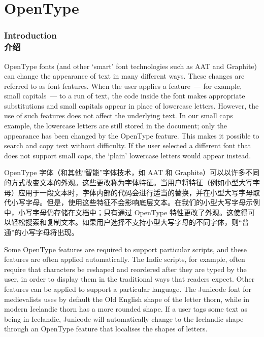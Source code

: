 \documentclass[a4paper]{l3doc}
\begin{document}
\part{OpenType}
\label{sec:opentype-features}

\section{Introduction\\介绍}
\label{sec:opentype-features-intro}

OpenType fonts (and other `smart' font technologies such as AAT and Graphite) can change the appearance of text in many different ways.
These changes are referred to as font features.
When the user applies a feature~--- for example, small capitals~--- to a run of text, the code inside the font makes appropriate substitutions and small capitals appear in place of lowercase letters.
However, the use of such features does not affect the underlying text.
In our small caps example, the lowercase letters are still stored in the document; only the appearance has been changed by the OpenType feature.
This makes it possible to search and copy text without difficulty.
If the user selected a different font that does not support small caps, the `plain' lowercase letters would appear instead.

OpenType 字体（和其他“智能”字体技术，如 AAT 和 Graphite）可以以许多不同的方式改变文本的外观。这些更改称为字体特征。当用户将特征（例如小型大写字母）应用于一段文本时，字体内部的代码会进行适当的替换，并在小型大写字母取代小写字母。但是，使用这些特征不会影响底层文本。在我们的小型大写字母示例中，小写字母仍存储在文档中；只有通过 OpenType 特性更改了外观。这使得可以轻松搜索和复制文本。如果用户选择不支持小型大写字母的不同字体，则“普通”的小写字母将出现。


Some OpenType features are required to support particular scripts, and these features are often applied automatically.
The Indic scripts, for example, often require that characters be reshaped and reordered after they are typed by the user, in order to display them in the traditional ways that readers expect.
Other features can be applied to support a particular language.
The Junicode font for medievalists uses by default the Old English shape of the letter thorn, while in modern Icelandic thorn has a more rounded shape.
If a user tags some text as being in Icelandic, Junicode will automatically change to the Icelandic shape through an OpenType feature that localises the shapes of letters.
\end{document}
